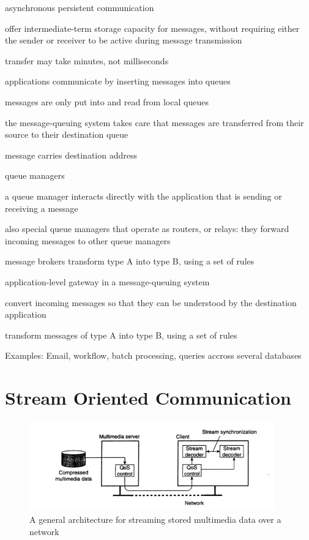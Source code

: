 \documentclass[ngerman,a4paper]{report}
\begin{document}
\begin{compactitem}
	\item asynchronous persistent communication
	\item offer intermediate-term storage capacity for messages, without requiring either the sender or receiver to be active during message transmission
	\item transfer may take minutes, not milliseconds
	\item applications communicate by inserting messages into queues
	\item messages are only put into and read from local queues
	\item the message-queuing system takes care that messages are transferred from their source to their destination queue
	\item message carries destination address
	\item queue managers
	\begin{compactitem}
		\item a queue manager interacts directly with the application that is sending or receiving a message
		\item also special queue managers that operate as routers, or relays: they forward incoming messages to other queue managers
	\end{compactitem}
	\item message brokers transform type A into type B, using a set of rules
		\begin{compactitem}
		\item application-level gateway in a message-queuing system
		\item convert incoming messages so that they can be understood by the destination application
		\item transform messages of type A into type B, using a set of rules
	\end{compactitem}
	\item Examples: Email, workflow, batch processing, queries accross several databases
\end{compactitem}

\section{Stream Oriented Communication}

\begin{figure}[h]
	\centering
	\includegraphics[width=400px]{gfx/streams.png}
	\caption{A general architecture for streaming stored multimedia data over a network}
	\label{img:streams}
\end{figure}
\end{document}
